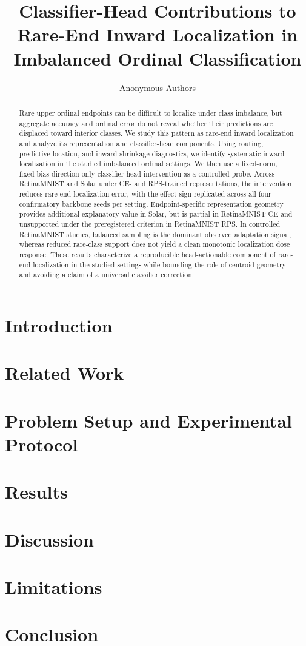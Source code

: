 \documentclass[11pt]{article}
\title{Classifier-Head Contributions to Rare-End Inward Localization in Imbalanced Ordinal Classification}
\author{Anonymous Authors}
\date{}
\begin{document}
\maketitle

\begin{abstract}
Rare upper ordinal endpoints can be difficult to localize under class
imbalance, but aggregate accuracy and ordinal error do not reveal whether their
predictions are displaced toward interior classes. We study this pattern as
rare-end inward localization and analyze its representation and
classifier-head components. Using routing, predictive location, and inward
shrinkage diagnostics, we identify systematic inward localization in the
studied imbalanced ordinal settings. We then use a fixed-norm, fixed-bias
direction-only classifier-head intervention as a controlled probe. Across
RetinaMNIST and Solar under CE- and RPS-trained representations, the
intervention reduces rare-end localization error, with the effect sign
replicated across all four confirmatory backbone seeds per setting.
Endpoint-specific representation geometry provides additional explanatory value
in Solar, but is partial in RetinaMNIST CE and unsupported under the
preregistered criterion in RetinaMNIST RPS. In controlled RetinaMNIST studies,
balanced sampling is the dominant observed adaptation signal, whereas reduced
rare-class support does not yield a clean monotonic localization dose response.
These results characterize a reproducible head-actionable component of
rare-end localization in the studied settings while bounding the role of
centroid geometry and avoiding a claim of a universal classifier correction.
\end{abstract}

\section{Introduction}


\section{Related Work}


\section{Problem Setup and Experimental Protocol}



\section{Results}


\section{Discussion}


\section{Limitations}


\section{Conclusion}




\end{document}
